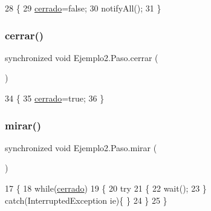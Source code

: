 \begin{DoxyCode}
28     \{
29         \mbox{\hyperlink{class_ejemplo2_1_1_paso_a035610e8d1c26212866e1195440287ec}{cerrado}}=\textcolor{keyword}{false};
30         notifyAll();
31     \}
\end{DoxyCode}
\mbox{\label{class_ejemplo2_1_1_paso_aef2fe3c01a50bc9b3b2351d3ce067d5b}} 
\subsubsection{\texorpdfstring{cerrar()}{cerrar()}}
{\footnotesize\ttfamily synchronized void Ejemplo2.\+Paso.\+cerrar (\begin{DoxyParamCaption}{ }\end{DoxyParamCaption})\hspace{0.3cm}{\ttfamily [inline]}}


\begin{DoxyCode}
34     \{
35         \mbox{\hyperlink{class_ejemplo2_1_1_paso_a035610e8d1c26212866e1195440287ec}{cerrado}}=\textcolor{keyword}{true};
36     \}
\end{DoxyCode}
\mbox{\label{class_ejemplo2_1_1_paso_a6d40a9340440e7b4fc7f19a35df68001}} 
\subsubsection{\texorpdfstring{mirar()}{mirar()}}
{\footnotesize\ttfamily synchronized void Ejemplo2.\+Paso.\+mirar (\begin{DoxyParamCaption}{ }\end{DoxyParamCaption})\hspace{0.3cm}{\ttfamily [inline]}}


\begin{DoxyCode}
17     \{
18         \textcolor{keywordflow}{while}(\mbox{\hyperlink{class_ejemplo2_1_1_paso_a035610e8d1c26212866e1195440287ec}{cerrado}})
19         \{
20             \textcolor{keywordflow}{try}
21             \{
22                 wait();
23             \} \textcolor{keywordflow}{catch}(InterruptedException ie)\{ \}
24         \}
25     \}
\end{DoxyCode}


